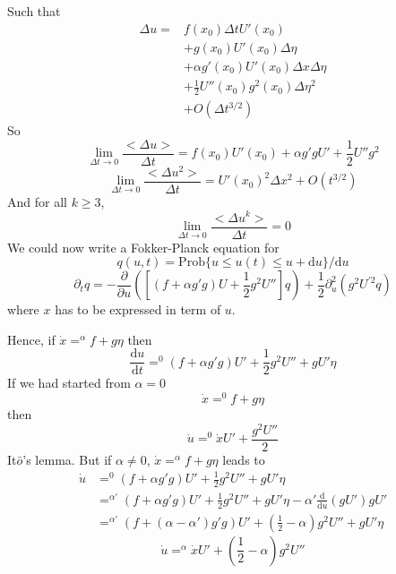 \documentclass[a4paper]{book}
\theoremstyle{definition}
\theoremstyle{remark}
\begin{document}
Such that 
\begin{equation}
    \begin{aligned}
        \Delta u = &f(x_0)\Delta t U'(x_0) \\
        &+g(x_0) U'(x_0)\Delta \eta \\
        &+\alpha g'(x_0)U'(x_0)\Delta x\Delta \eta \\
        &+ \frac{1}{2} U''(x_0)g^2(x_0)\Delta \eta ^2 \\
        &+ O(\Delta t ^{3/2})
    \end{aligned}
\end{equation}
So
\begin{equation}
    \lim_{\Delta t \rightarrow 0}\frac{<\Delta u>}{\Delta t} = f(x_0)U'(x_0) + \alpha g'gU' + \frac{1}{2}U'' g^2
\end{equation}
\begin{equation}
    \lim_{\Delta t \rightarrow 0}\frac{<\Delta u^2>}{\Delta t} = U'(x_0)^2\Delta x^2 + O(t^{3/2})
\end{equation}
And for all $k \geq 3$, 
\begin{equation}
    \lim_{\Delta t \rightarrow 0}\frac{<\Delta u^k>}{\Delta t} = 0
\end{equation}
We could now write a Fokker-Planck equation for 
\begin{equation}
    q(u, t) = \text{Prob}\{ u \leq u(t) \leq u+\text{d}u\}/\text{d}u
\end{equation}
\begin{equation}
    \partial_t q = -\frac{\partial}{\partial u}\left([(f + \alpha g'g)U + \frac{1}{2}g^2U'']q\right) + \frac{1}{2}\partial_u^2(g^2U^{'2} q)
\end{equation}
where $x$ has to be expressed in term of $u$. \par \medskip 
Hence, if $\dot{x}=^\alpha f + g\eta$ then 
\begin{equation}
    \frac{\text{d}u}{\text{d}t} =^0 (f + \alpha g'g)U' + \frac{1}{2}g^2 U'' + gU'\eta
\end{equation}
If we had started from $\alpha = 0$
\begin{equation}
    \dot{x} =^0 f + g\eta
\end{equation}
then 
\begin{equation}
    \dot{u} =^0 \dot{x}U' + \frac{g^2U''}{2}
\end{equation}
It$\bar{o}$'s lemma. But if $\alpha \neq 0$, $\dot{x}=^\alpha f + g\eta$ leads to 
\begin{equation}
    \begin{aligned}
        \dot{u} &=^0 (f + \alpha g'g)U' + \frac{1}{2}g^2 U'' + gU'\eta \\
        &=^{\alpha'} (f + \alpha g'g)U' + \frac{1}{2}g^2 U'' + gU'\eta - \alpha' \frac{\text{d}}{\text{d}u}\left(gU'\right)gU'\\
        &=^{\alpha'} (f + (\alpha-\alpha') g'g)U' + (\frac{1}{2}-\alpha)g^2 U'' + gU'\eta 
    \end{aligned}
\end{equation}
\begin{equation}
    \dot{u} =^{\alpha} \dot{x}U' + (\frac{1}{2}- \alpha)g^2U''
\end{equation}
\end{document}

